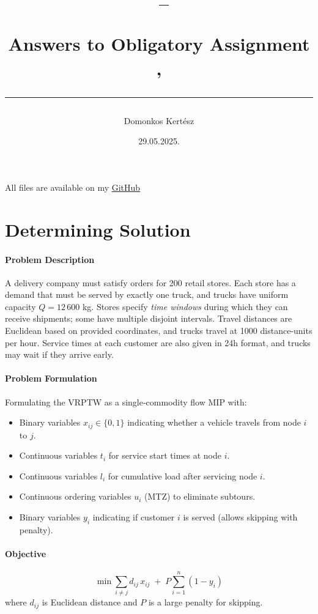 \documentclass[a4paper,11pt]{article}
\author{Domonkos Kertész}
\title{\begin{flushleft}
\vspace{-4ex}
\courseid~-- \coursename \\[0.2cm]
{\Large Answers to Obligatory Assignment \assnr, \term \\[3ex]
\hrule}
\end{flushleft}
}
\date{29.05.2025.}
\begin{document}
\maketitle
\setlength{\headheight}{26pt}

\newpage

All files are available on my \href{https://github.com/KihiraLove/SDU-Works/tree/main/Mathematical%20Optimization/ClassWork/Assignment_2}{GitHub}

\section{Determining Solution}

\paragraph{Problem Description}
A delivery company must satisfy orders for 200 retail stores. Each store has a demand that must be served by exactly one truck, and trucks have uniform capacity \(Q=12\,600\) kg. Stores specify \emph{time windows} during which they can receive shipments; some have multiple disjoint intervals. Travel distances are Euclidean based on provided coordinates, and trucks travel at 1000 distance‐units per hour. Service times at each customer are also given in 24h format, and trucks may wait if they arrive early.  

\paragraph{Problem Formulation}
Formulating the VRPTW as a single‐commodity flow MIP with:
\begin{itemize}
  \item Binary variables \(x_{ij}\in\{0,1\}\) indicating whether a vehicle travels from node \(i\) to \(j\).
  \item Continuous variables \(t_i\) for service start times at node \(i\).
  \item Continuous variables \(l_i\) for cumulative load after servicing node \(i\).
  \item Continuous ordering variables \(u_i\) (MTZ) to eliminate subtours.
  \item Binary variables \(y_i\) indicating if customer \(i\) is served (allows skipping with penalty).
\end{itemize}

\paragraph{Objective}
\[
\min 
\sum_{i\neq j} d_{ij}\,x_{ij}
\;+\;P\sum_{i=1}^n (1 - y_i)
\]
where \(d_{ij}\) is Euclidean distance and \(P\) is a large penalty for skipping.
\end{document}

